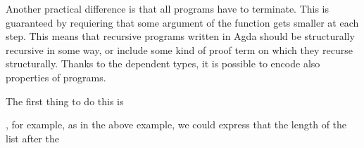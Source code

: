 Another practical difference is that all programs have to terminate. This is guaranteed by requiering that some argument of the function gets smaller at each step. This means that recursive programs written in Agda should be structurally recursive in some way, or include some kind of proof term on which they recurse structurally.
Thanks to the dependent types, it is possible to encode also properties of programs.

The first thing to do this is 

, for example, as in the above example, we could express that the length of the list after the 
